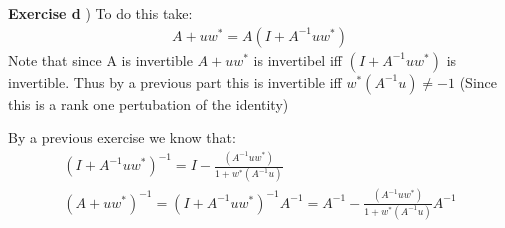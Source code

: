 \documentclass[12pt]{article}
\newenvironment{exercise}[1]{\vspace{.1in}\noindent\textbf{Exercise #1 \hspace{.05em}}}{}
\begin{document}
\begin{exercise}{2.5}
	d) To do this take:
	\begin{align}
		A+uw^*=A(I+A^{-1}uw^*)
	\end{align}
	Note that since A is invertible $A+uw^*$ is invertibel iff $(I+A^{-1}uw^*)$ is invertible. Thus by a previous part this is invertible iff $w^*(A^{-1}u)\neq -1$ (Since this is a rank one pertubation of the identity)

	By a previous exercise we know that:
	\begin{align}
		(I+A^{-1}uw^*)^{-1}=I-\frac{(A^{-1}uw^*)}{1+w^*(A^{-1}u)}                                \\
		(A+uw^*)^{-1}=(I+A^{-1}uw^*)^{-1}A^{-1}=A^{-1}-\frac{(A^{-1}uw^*)}{1+w^*(A^{-1}u)}A^{-1} \\
	\end{align}
\end{exercise}
\end{document}
